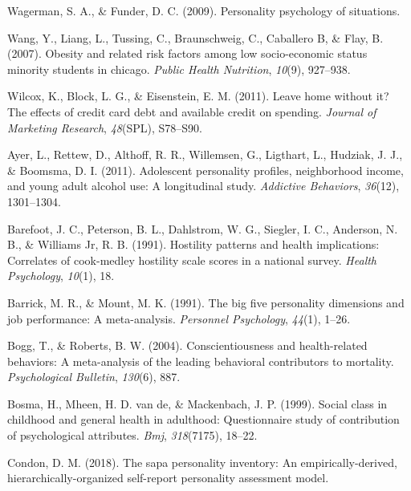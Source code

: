\documentclass[man]{apa6}
\begin{document}
\leavevmode\hypertarget{ref-wagerman2009personality}{}%
Wagerman, S. A., \& Funder, D. C. (2009). Personality psychology of situations.

\leavevmode\hypertarget{ref-wang2007}{}%
Wang, Y., Liang, L., Tussing, C., Braunschweig, C., Caballero B, \& Flay, B. (2007). Obesity and related risk factors among low socio-economic status minority students in chicago. \emph{Public Health Nutrition}, \emph{10}(9), 927--938.

\leavevmode\hypertarget{ref-wilcox2011leave}{}%
Wilcox, K., Block, L. G., \& Eisenstein, E. M. (2011). Leave home without it? The effects of credit card debt and available credit on spending. \emph{Journal of Marketing Research}, \emph{48}(SPL), S78--S90.

\leavevmode\hypertarget{ref-ayer2011adolescent}{}%
Ayer, L., Rettew, D., Althoff, R. R., Willemsen, G., Ligthart, L., Hudziak, J. J., \& Boomsma, D. I. (2011). Adolescent personality profiles, neighborhood income, and young adult alcohol use: A longitudinal study. \emph{Addictive Behaviors}, \emph{36}(12), 1301--1304.

\leavevmode\hypertarget{ref-barefoot1991hostility}{}%
Barefoot, J. C., Peterson, B. L., Dahlstrom, W. G., Siegler, I. C., Anderson, N. B., \& Williams Jr, R. B. (1991). Hostility patterns and health implications: Correlates of cook-medley hostility scale scores in a national survey. \emph{Health Psychology}, \emph{10}(1), 18.

\leavevmode\hypertarget{ref-barrick1991big}{}%
Barrick, M. R., \& Mount, M. K. (1991). The big five personality dimensions and job performance: A meta-analysis. \emph{Personnel Psychology}, \emph{44}(1), 1--26.

\leavevmode\hypertarget{ref-bogg2004conscientiousness}{}%
Bogg, T., \& Roberts, B. W. (2004). Conscientiousness and health-related behaviors: A meta-analysis of the leading behavioral contributors to mortality. \emph{Psychological Bulletin}, \emph{130}(6), 887.

\leavevmode\hypertarget{ref-bosma1999social}{}%
Bosma, H., Mheen, H. D. van de, \& Mackenbach, J. P. (1999). Social class in childhood and general health in adulthood: Questionnaire study of contribution of psychological attributes. \emph{Bmj}, \emph{318}(7175), 18--22.

\leavevmode\hypertarget{ref-condon2018sapa}{}%
Condon, D. M. (2018). The sapa personality inventory: An empirically-derived, hierarchically-organized self-report personality assessment model.
\end{document}
